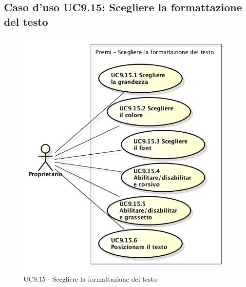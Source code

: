 \subsection{Caso d'uso UC9.15: Scegliere la formattazione del testo}
\begin{figure}[h] 
	\centering 
	\includegraphics[scale=0.45] {img/UC9.15.png}
	\caption{UC9.15 - Scegliere la formattazione del testo}
\end{figure}

